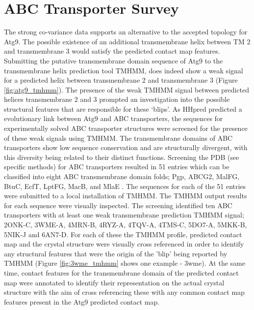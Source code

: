 \section{ABC Transporter Survey}
The strong co-variance data supports an alternative to the accepted topology for Atg9. The possible existence of an additional transmembrane helix between TM 2 and transmembrane 3 would satisfy the predicted contact map features. Submitting the putative transmembrane domain sequence of Atg9 to the transmembrane helix prediction tool TMHMM, does indeed show a weak signal for a predicted helix between transmembrane 2 and transmembrane 3 (Figure \ref{fig:atg9_tmhmm}). The presence of the weak TMHMM signal between predicted helices transmembrane 2 and 3 prompted an investigation into the possible
structural features that are responsible for these ‘blips’. As HHpred predicted a evolutionary link between Atg9 and ABC transporters, the sequences for experimentally solved ABC transporter structures were screened for the presence of these weak signals using TMHMM. The transmembrane domains of ABC transporters show low sequence conservation and are structurally divergent, with this diversity being related to their distinct functions. Screening the PDB (see specific methods) for ABC transporters resulted in 51 entries which can be classified into eight ABC transmembrane domain folds; Pgp, ABCG2, MalFG, BtuC, EcfT, LptFG, MacB, and MlaE \cite{srikant2020evolutionary}.  The sequences for each of the 51 entries were submitted to a local installation of TMHMM.  The TMHMM output results for each sequence were visually inspected. The screening identified ten ABC transporters with at least one weak transmembrane prediction TMHMM signal; 2ONK-C, 3WME-A, 4MRN-B, 4RYZ-A, 4TQV-A, 4TMS-C, 5DO7-A, 5MKK-B, 5NIK-J and 6AN7-D.  For each of these the TMHMM profile, predicted contact map and the crystal structure were visually cross referenced in order to identify any structural features that were the origin of the 'blip' being reported by TMHMM (Figure \ref{fig:3wme_tmhmm} shows one example - 3wme).  At the same time, contact features for the transmembrane domain of the predicted contact map were annotated to identify their representation on the actual crystal structure with the aim of cross referencing these with any common contact map features present in the Atg9 predicted contact map. 

